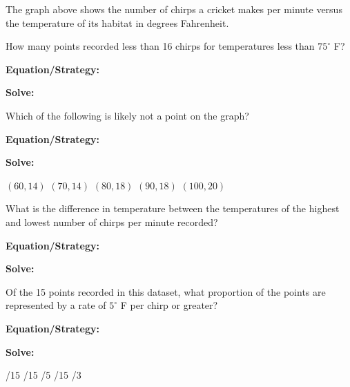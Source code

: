The graph above shows the number of chirps a cricket makes per minute versus the temperature of its habitat in degrees Fahrenheit.

\begin{multicols*}{2}
\begin{outline}[enumerate]
\medium

\1 How many points recorded less than 16 chirps for temperatures less than $75^\circ$ F?

\bigskip
\textbf{Equation/Strategy:} \hrulefill

\bigskip
\textbf{Solve:}

\vfill
{}
\vfill\phantom{}

\columnbreak
\1 Which of the following is likely not a point on the graph?

\bigskip
\textbf{Equation/Strategy:} \hrulefill

\bigskip
\textbf{Solve:}

\vfill
\2 $(60,14)$
\2 $(70,14)$
\2 $(80,18)$
\2 $(90,18)$
\2 $(100,20)$

\vfill\phantom{}
\pagebreak
\advanced

\1 What is the difference in temperature between the temperatures of the highest and lowest number of chirps per minute recorded?

\bigskip
\textbf{Equation/Strategy:}

\bigskip
\textbf{Solve:}

\vfill
{}

\midline

\1 Of the 15 points recorded in this dataset, what proportion of the points are represented by a rate of $5^\circ$ F per chirp or greater?

\bigskip
\textbf{Equation/Strategy:} \hrulefill

\bigskip
\textbf{Solve:}

\vfill
{}/15
/15
/5
/15
/3
\end{outline}
\end{multicols*}
